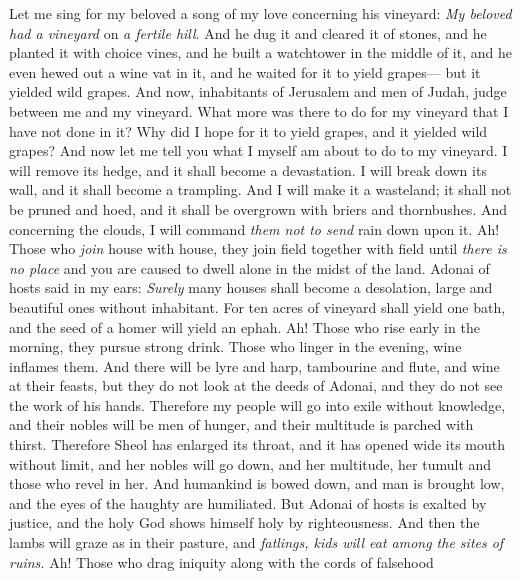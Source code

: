 \begin{biblechapter} %
 Let me sing for my beloved 
a song of my love concerning his vineyard: 
\textit{My beloved had a vineyard} on \textit{a fertile hill}.
\verse And he dug it and cleared it of stones, 
and he planted it with choice vines, 
and he built a watchtower in the middle of it, 
and he even hewed out a wine vat in it, 
and he waited for it to yield grapes— 
but it yielded wild grapes.
\verse And now, inhabitants of Jerusalem 
and men of Judah, judge between me and my vineyard.
\verse What more was there to do for my vineyard that I have not done in it? 
Why did I hope for it to yield grapes, and it yielded wild grapes?
\verse And now let me tell you what I myself am about to do to my vineyard.
\verse I will remove its hedge, and it shall become a devastation. 
I will break down its wall, and it shall become a trampling.
\verse And I will make it a wasteland; 
it shall not be pruned and hoed, 
and it shall be overgrown with briers and thornbushes. 
And concerning the clouds, I will command \textit{them not to send} rain down upon it.
 Ah! Those who \textit{join} house with house, 
they join field together with field 
until \textit{there is no place} 
and you are caused to dwell alone in the midst of the land.
\verse Adonai of hosts said in my ears:
\verse \textit{Surely} many houses shall become a desolation, 
large and beautiful ones without inhabitant.
\verse For ten acres of vineyard shall yield one bath, 
and the seed of a homer will yield an ephah.
\verse Ah! Those who rise early in the morning, 
they pursue strong drink. 
Those who linger in the evening, 
wine inflames them.
\verse And there will be lyre and harp, 
tambourine and flute, 
and wine at their feasts, 
but they do not look at the deeds of Adonai, 
and they do not see the work of his hands.
\verse Therefore my people will go into exile without knowledge, 
and their nobles will be men of hunger, 
and their multitude is parched with thirst.
\verse Therefore Sheol has enlarged its throat, 
and it has opened wide its mouth without limit, 
and her nobles will go down, and her multitude, 
her tumult and those who revel in her.
\verse And humankind is bowed down, 
and man is brought low, 
and the eyes of the haughty are humiliated.
\verse But Adonai of hosts is exalted by justice, 
and the holy God shows himself holy by righteousness.
\verse And then the lambs will graze as in their pasture, 
and \textit{fatlings, kids will eat among the sites of ruins.}
\verse Ah! Those who drag iniquity along with the cords of falsehood 

\end{biblechapter}
